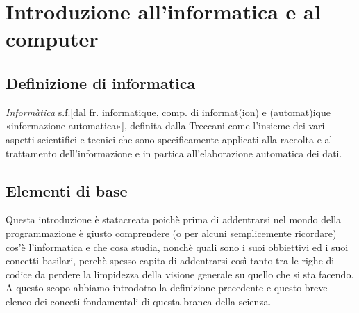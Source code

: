 \chapter{Introduzione all'informatica e al computer}
\section{Definizione di informatica}
\textit{Informàtica} s.f.[dal fr. informatique, comp. di informat(ion) e (automat)ique «informazione automatica»], definita dalla Treccani come l’insieme dei vari aspetti scientifici e tecnici che sono specificamente applicati alla raccolta e al trattamento dell’informazione e in partica all’elaborazione automatica dei dati.\\
\section{Elementi di base}
Questa introduzione è statacreata poichè prima di addentrarsi nel mondo della programmazione è giusto comprendere (o per alcuni semplicemente ricordare) cos'è l'informatica e che cosa studia, nonchè quali sono i suoi obbiettivi ed i suoi concetti basilari, perchè spesso capita di addentrarsi così tanto tra le righe di codice da perdere la limpidezza della visione generale su quello che si sta facendo.\\ 
A questo scopo abbiamo introdotto la definizione precedente e questo breve elenco dei conceti fondamentali di questa branca della scienza.
